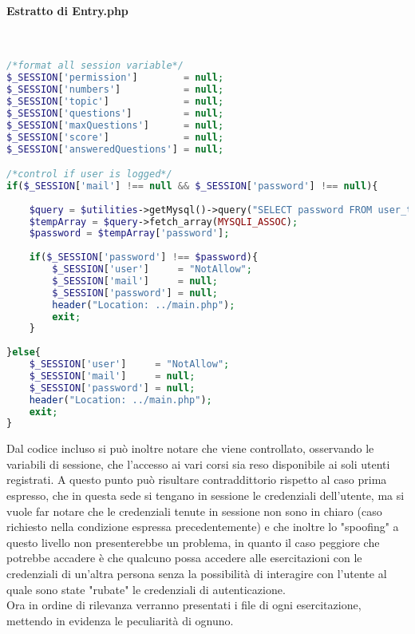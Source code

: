 \paragraph{Estratto di Entry.php}\leavevmode\\

\begin{lstlisting}[language=php]
/*format all session variable*/
$_SESSION['permission']        = null;
$_SESSION['numbers']           = null;
$_SESSION['topic']             = null;
$_SESSION['questions']         = null;
$_SESSION['maxQuestions']      = null;
$_SESSION['score']             = null;
$_SESSION['answeredQuestions'] = null;

/*control if user is logged*/
if($_SESSION['mail'] !== null && $_SESSION['password'] !== null){
	
	$query = $utilities->getMysql()->query("SELECT password FROM user_table1 WHERE (email = '{$_SESSION['mail']}')");
	$tempArray = $query->fetch_array(MYSQLI_ASSOC);
	$password = $tempArray['password'];
	
	if($_SESSION['password'] !== $password){
		$_SESSION['user']     = "NotAllow";
		$_SESSION['mail']     = null;
		$_SESSION['password'] = null;
		header("Location: ../main.php");
		exit;
	}
	
}else{
	$_SESSION['user']     = "NotAllow";
	$_SESSION['mail']     = null;
	$_SESSION['password'] = null;
	header("Location: ../main.php");
	exit;
}
\end{lstlisting}
Dal codice incluso si può inoltre notare che viene controllato, osservando le variabili di sessione, che l'accesso ai vari corsi sia reso disponibile ai soli utenti registrati. A questo punto può risultare contraddittorio rispetto al caso prima espresso, che in questa sede si tengano in sessione le credenziali dell'utente, ma si vuole far notare che le credenziali tenute in sessione non sono in chiaro (caso richiesto nella condizione espressa precedentemente) e che inoltre lo "spoofing" a questo livello non presenterebbe un problema, in quanto il caso peggiore che potrebbe accadere è che qualcuno possa accedere alle esercitazioni con le  credenziali di un'altra persona senza la possibilità di interagire con l'utente al quale sono state "rubate" le credenziali di autenticazione.\\

Ora in ordine di rilevanza verranno presentati i file di ogni esercitazione, mettendo in evidenza le peculiarità di ognuno.\\


